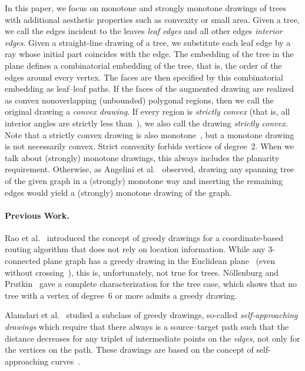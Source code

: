 \documentclass[a4paper,11pt]{article}
\theoremstyle{plain}
\begin{document}
In this paper, we focus on monotone and strongly monotone drawings of
trees with additional aesthetic properties such as convexity or small
area.  Given a tree, we call the 
edges incident to the leaves \emph{leaf edges} and all other edges
\emph{interior edges}.  Given a straight-line drawing of a tree, we
substitute each leaf edge by a ray whose initial part coincides with
the edge. The embedding of the tree in the plane defines a combinatorial embedding
of the tree, that is, the order of the edges around every vertex. The
faces are then specified by this combinatorial embedding as leaf--leaf paths. 
If the faces of the augmented drawing are realized as convex nonoverlapping
(unbounded) polygonal regions, then we call the original drawing a
\emph{convex drawing}.  If every region is \emph{strictly convex}
(that is, all interior angles are strictly less than~), we also
call the drawing \emph{strictly convex}.  Note that a strictly convex
drawing is also monotone~\cite{acbfp-mdg-12,acm-mpaoa-SoCG89}, but a
monotone drawing is not necessarily convex.  Strict convexity forbids vertices 
of degree~2. When we talk about (strongly) monotone drawings, 
this always includes the planarity requirement.  Otherwise, as Angelini et
al.~\cite{acbfp-mdg-12} observed, drawing any spanning tree of the given
graph in a (strongly) monotone way and inserting the remaining edges
would yield a (strongly) monotone drawing of the graph.


\paragraph{Previous Work.}
Rao et al.~\cite{rpss-grwli-MOBICOM03} introduced the concept of 
greedy drawings for a coordinate-based routing algorithm that does not rely
on location information. While any 3-connected plane graph has a greedy drawing
in the Euclidean plane~\cite{lm-gems-10} (even without crossing~\cite{d-gdt-10}),
this is, unfortunately, not true for trees.  
N\"ollenburg and Prutkin~\cite{np-egdt-ESA13} gave a complete
characterization for the tree case, which shows that no tree with a
vertex of degree~6 or more admits a greedy drawing.  

Alamdari et al.~\cite{acglp-sag-GD12} studied a subclass of greedy drawings,
so-called \emph{self-approaching drawings} which require that there
always is a source--target path such that the distance decreases for
any triplet of intermediate points on the \emph{edges}, not only for
the vertices on the path.  These drawings are based on the concept of
self-approaching curves~\cite{ikl-sac-MPCPS95}. 
\end{document}
